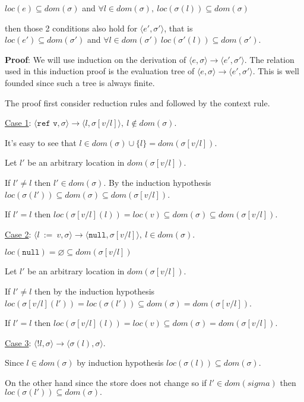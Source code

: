\documentclass[10pt]{article}
\begin{document}
\begin{enumerate} [(a)]
    $loc(e) \subseteq dom(\sigma)$ and $\forall l \in dom(\sigma),~loc(\sigma(l)) \subseteq dom(\sigma)$

    then those 2 conditions also hold for $\langle e', \sigma' \rangle$, that is \\
    $loc(e') \subseteq dom(\sigma')$ and $\forall l \in dom(\sigma')~loc(\sigma'(l)) \subseteq dom(\sigma')$.

    \textbf{Proof}: We will use induction on the derivation of $\langle e, \sigma \rangle \rightarrow \langle e', \sigma' \rangle$. The relation used in this induction proof is the evaluation tree of $\langle e, \sigma \rangle \rightarrow \langle e', \sigma' \rangle$. This is well founded since such a tree is always finite.

    The proof first consider reduction rules and followed by the context rule.

    \underline{Case 1}: $\langle \texttt{ref v}, \sigma \rangle \rightarrow \langle l, \sigma[v/l] \rangle,~l \notin dom(\sigma)$.

    It's easy to see that $l \in dom(\sigma) \cup \{l\} = dom(\sigma[v/l])$.

    Let $l'$ be an arbitrary location in $dom(\sigma[v/l])$.

    If $l' \neq l$ then $l' \in dom(\sigma)$. By the induction hypothesis $loc(\sigma(l')) \subseteq dom(\sigma) \subseteq dom(\sigma[v/l])$.

    If $l' = l$ then $loc(\sigma[v/l](l)) = loc(v) \subseteq dom(\sigma) \subseteq dom(\sigma[v/l]).$

    \underline{Case 2}: $\langle l~:=~v, \sigma \rangle \rightarrow \langle \texttt{null}, \sigma[v/l] \rangle,~l \in dom(\sigma)$.

    $loc(\texttt{null}) = \varnothing \subseteq dom(\sigma[v/l])$

    Let $l'$ be an arbitrary location in $dom(\sigma[v/l])$.

    If $l' \neq l$ then by the induction hypothesis $loc(\sigma[v/l](l'))  = loc(\sigma(l')) \subseteq dom(\sigma) = dom(\sigma[v/l])$.

    If $l' = l$ then $loc(\sigma[v/l](l)) = loc(v) \subseteq dom(\sigma) = dom(\sigma[v/l]).$

    \underline{Case 3}: $\langle !l, \sigma \rangle \rightarrow \langle \sigma(l), \sigma\rangle$.

    Since $l \in dom(\sigma)$ by induction hypothesis $loc(\sigma(l)) \subseteq dom(\sigma)$.

    On the other hand since the store does not change so if $l' \in dom(sigma)$ then $loc(\sigma(l')) \subseteq dom(\sigma).$


\end{enumerate}
\end{document}
